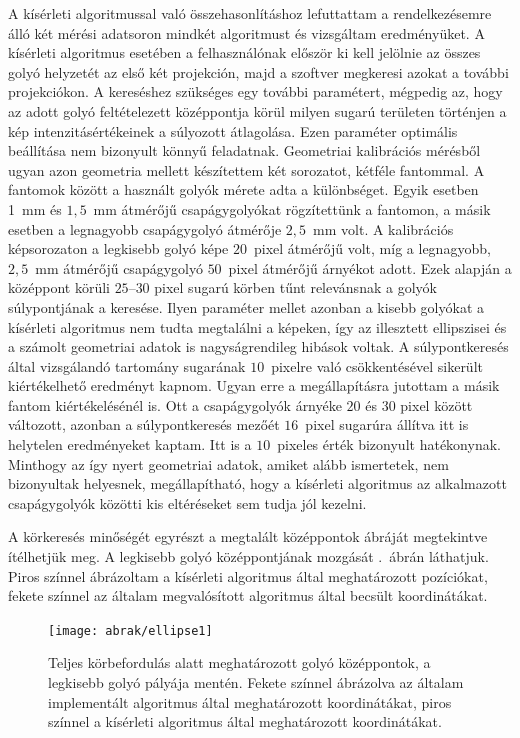 \documentclass[a4paper,12pt]{article}
\begin{document}
A kísérleti algoritmussal való összehasonlításhoz lefuttattam a rendelkezésemre álló két mérési adatsoron mindkét algoritmust és vizsgáltam eredményüket. A kísérleti algoritmus esetében a felhasználónak először ki kell jelölnie az összes golyó helyzetét az első két projekción, majd a szoftver megkeresi azokat a további projekciókon. A kereséshez szükséges egy további paramétert, mégpedig az, hogy az adott golyó feltételezett középpontja körül milyen sugarú területen történjen a kép intenzitásértékeinek a súlyozott átlagolása. Ezen paraméter optimális beállítása nem bizonyult könnyű feladatnak. Geometriai kalibrációs mérésből ugyan azon geometria mellett készítettem két sorozatot, kétféle fantommal. A fantomok között a használt golyók mérete adta a különbséget. Egyik esetben 1~mm és $1,\!5$~mm átmérőjű csapágygolyókat rögzítettünk a fantomon, a másik esetben a legnagyobb csapágygolyó átmérője $2,\!5$~mm volt. A kalibrációs képsorozaton a legkisebb golyó képe $20$~pixel átmérőjű volt, míg a legnagyobb, $2,\!5$~mm átmérőjű csapágygolyó $50$~pixel átmérőjű árnyékot adott. Ezek alapján a középpont körüli $25$--$30$ pixel sugarú körben tűnt relevánsnak a golyók súlypontjának a keresése. Ilyen paraméter mellet azonban a kisebb golyókat a kísérleti algoritmus nem tudta megtalálni a képeken, így az illesztett ellipszisei és a számolt geometriai adatok is nagyságrendileg hibások voltak. A súlypontkeresés által vizsgálandó tartomány sugarának $10$~pixelre való csökkentésével sikerült kiértékelhető eredményt kapnom. Ugyan erre a megállapításra jutottam a másik fantom kiértékelésénél is. Ott a csapágygolyók árnyéke $20$ és $30$ pixel között változott, azonban a súlypontkeresés mezőét $16$~pixel sugarúra állítva itt is helytelen eredményeket kaptam. Itt is a $10$~pixeles érték bizonyult hatékonynak. Minthogy az így nyert geometriai adatok, amiket alább ismertetek, nem bizonyultak helyesnek, megállapítható, hogy a kísérleti algoritmus az alkalmazott csapágygolyók közötti kis eltéréseket sem tudja jól kezelni.

A körkeresés minőségét egyrészt a megtalált középpontok ábráját megtekintve ítélhetjük meg. A legkisebb golyó  középpontjának mozgását .~ábrán láthatjuk. Piros színnel ábrázoltam a kísérleti algoritmus által meghatározott pozíciókat, fekete színnel az általam megvalósított algoritmus által becsült koordinátákat.




\begin{figure}[htbp]
\center
\texttt{[image: abrak/ellipse1]}
\caption{Teljes körbefordulás alatt meghatározott golyó középpontok, a legkisebb golyó pályája  mentén. Fekete színnel ábrázolva az általam implementált algoritmus által meghatározott koordinátákat, piros színnel a kísérleti algoritmus által meghatározott koordinátákat.}
\label{fig:ellipseskicsi}
\end{figure}
\end{document}
